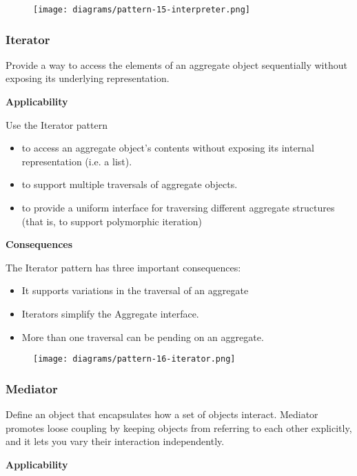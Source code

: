 \documentclass{article}
\begin{document}
\begin{figure}[h]
    \centering
    \texttt{[image: diagrams/pattern-15-interpreter.png]}
\end{figure}

\newpage
\subsubsection{Iterator}
Provide a way to access the elements of an aggregate object sequentially without exposing its underlying representation.

\textbf{Applicability}

Use the Iterator pattern

\begin{itemize}
    \item to access an aggregate object's contents without exposing its internal representation (i.e. a list).
    \item to support multiple traversals of aggregate objects.
    \item to provide a uniform interface for traversing different aggregate structures (that is, to support polymorphic iteration)
\end{itemize}

\textbf{Consequences}

The Iterator pattern has three important consequences:
\begin{itemize}
    \item It supports variations in the traversal of an aggregate
    \item Iterators simplify the Aggregate interface.
    \item More than one traversal can be pending on an aggregate.
\end{itemize}

\begin{figure}[h]
    \centering
    \texttt{[image: diagrams/pattern-16-iterator.png]}
\end{figure}

\newpage
\subsubsection{Mediator}
Define an object that encapsulates how a set of objects interact. Mediator promotes loose coupling by keeping objects from referring to each other explicitly, and it lets you vary their interaction independently.

\textbf{Applicability}
\end{document}

